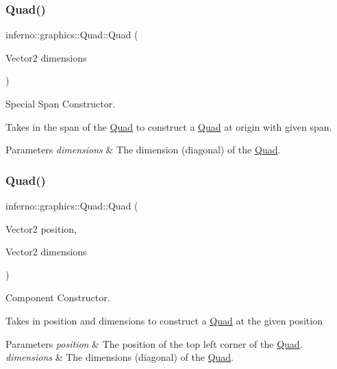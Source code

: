 \subsubsection{\texorpdfstring{Quad()}{Quad()}\hspace{0.1cm}{\footnotesize\ttfamily [3/6]}}
{\footnotesize\ttfamily inferno\+::graphics\+::\+Quad\+::\+Quad (\begin{DoxyParamCaption}\item[{Vector2}]{dimensions }\end{DoxyParamCaption})\hspace{0.3cm}{\ttfamily [inline]}}



Special Span Constructor. 

Takes in the span of the \mbox{\hyperlink{classinferno_1_1graphics_1_1_quad}{Quad}} to construct a \mbox{\hyperlink{classinferno_1_1graphics_1_1_quad}{Quad}} at origin with given span. 
\begin{DoxyParams}{Parameters}
{\em dimensions} & The dimension (diagonal) of the \mbox{\hyperlink{classinferno_1_1graphics_1_1_quad}{Quad}}. \\
\hline
\end{DoxyParams}
\mbox{\label{classinferno_1_1graphics_1_1_quad_a374a4dd2744317ea37ff568800148b1f}} 
\subsubsection{\texorpdfstring{Quad()}{Quad()}\hspace{0.1cm}{\footnotesize\ttfamily [4/6]}}
{\footnotesize\ttfamily inferno\+::graphics\+::\+Quad\+::\+Quad (\begin{DoxyParamCaption}\item[{Vector2}]{position,  }\item[{Vector2}]{dimensions }\end{DoxyParamCaption})\hspace{0.3cm}{\ttfamily [inline]}}



Component Constructor. 

Takes in position and dimensions to construct a \mbox{\hyperlink{classinferno_1_1graphics_1_1_quad}{Quad}} at the given position 
\begin{DoxyParams}{Parameters}
{\em position} & The position of the top left corner of the \mbox{\hyperlink{classinferno_1_1graphics_1_1_quad}{Quad}}. \\
\hline
{\em dimensions} & The dimensions (diagonal) of the \mbox{\hyperlink{classinferno_1_1graphics_1_1_quad}{Quad}}. \\
\hline
\end{DoxyParams}
\mbox{\label{classinferno_1_1graphics_1_1_quad_a9d9cc7ada7648b434b7401d88435530f}} 
